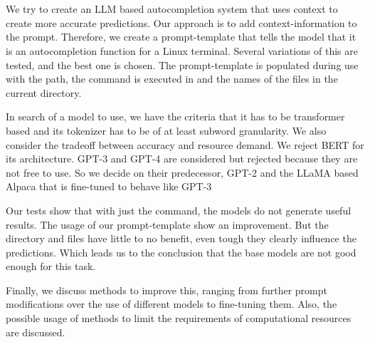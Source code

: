 \section*{}
We try to create an LLM based autocompletion system that uses context to create more accurate predictions. Our approach is to add context-information to the prompt. Therefore, we create a prompt-template that tells the model that it is an autocompletion function for a Linux terminal. Several variations of this are tested, and the best one is chosen. The prompt-template is populated during use with the path, the command is executed in and the names of the files in the current directory.



In search of a model to use, we have the criteria that it has to be transformer based and its tokenizer has to be of at least subword granularity. We also consider the tradeoff between accuracy and resource demand. We reject BERT for its architecture. GPT-3 and GPT-4 are considered but rejected because they are not free to use.
So we decide on their predecessor, GPT-2 and the LLaMA based Alpaca that is fine-tuned to behave like GPT-3



Our tests show that with just the command, the models do not generate useful results. The usage of our prompt-template show an improvement. But the directory and files have little to no benefit, even tough they clearly influence the predictions. Which leads us to the conclusion that the base models are not good enough for this task.

Finally, we discuss methods to improve this, ranging from further prompt modifications over the use of different models to fine-tuning them. Also, the possible usage of methods to limit the requirements of computational resources are discussed.